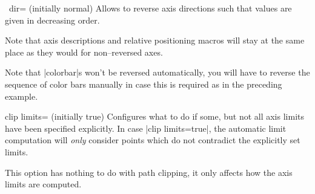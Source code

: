 \begin{pgfplotsxykey}{\x\ dir= (initially normal)}
	Allows to reverse axis directions such that values are given in decreasing order.
\label{key:pgfplots:xydir}
\begin{codeexample}[]
\end{codeexample}

\begin{codeexample}[]
\end{codeexample}

	Note that axis descriptions and relative positioning macros will stay at the same place as they would for non--reversed axes.
\begin{codeexample}[]
\end{codeexample}

	Note that |colorbar|s won't be reversed automatically, you will have to reverse the sequence of color bars manually in case this is required as in the preceding example.
\end{pgfplotsxykey}

\begin{pgfplotskey}{clip limits= (initially true)}
	Configures what to do if some, but not all axis limits have been specified explicitly. In case |clip limits=true|, the automatic limit computation will \emph{only} consider points which do not contradict the explicitly set limits.

	This option has nothing to do with path clipping, it only affects how the axis limits are computed.
\end{pgfplotskey}

